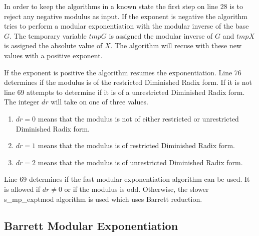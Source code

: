 \documentclass[b5paper]{book}
\begin{document}
In order to keep the algorithms in a known state the first step on line 28 is to reject any negative modulus as input.  If the exponent is
negative the algorithm tries to perform a modular exponentiation with the modular inverse of the base $G$.  The temporary variable $tmpG$ is assigned
the modular inverse of $G$ and $tmpX$ is assigned the absolute value of $X$.  The algorithm will recuse with these new values with a positive
exponent.

If the exponent is positive the algorithm resumes the exponentiation.  Line 76 determines if the modulus is of the restricted Diminished Radix 
form.  If it is not line 69 attempts to determine if it is of a unrestricted Diminished Radix form.  The integer $dr$ will take on one
of three values.

\begin{enumerate}
\item $dr = 0$ means that the modulus is not of either restricted or unrestricted Diminished Radix form.
\item $dr = 1$ means that the modulus is of restricted Diminished Radix form.
\item $dr = 2$ means that the modulus is of unrestricted Diminished Radix form.
\end{enumerate}

Line 69 determines if the fast modular exponentiation algorithm can be used.  It is allowed if $dr \ne 0$ or if the modulus is odd.  Otherwise,
the slower s\_mp\_exptmod algorithm is used which uses Barrett reduction.  

\subsection{Barrett Modular Exponentiation}
\end{document}
